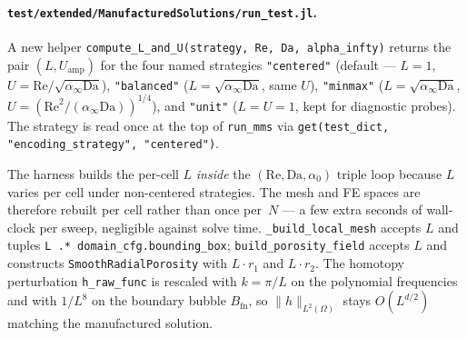 \documentclass[11pt]{article}
\newcommand{\code}[1]{\texttt{#1}}
\begin{document}
\paragraph{\texttt{test/extended/ManufacturedSolutions/run\_test.jl}.}
A new helper
\code{compute\_L\_and\_U(strategy, Re, Da, alpha\_infty)}
returns the pair $(L, U_{\text{amp}})$ for the four named strategies
\code{"centered"} (default — $L = 1$, $U = \mathrm{Re}/\sqrt{\alpha_\infty \mathrm{Da}}$),
\code{"balanced"} ($L = \sqrt{\alpha_\infty \mathrm{Da}}$,
same $U$),
\code{"minmax"} ($L = \sqrt{\alpha_\infty \mathrm{Da}}$,
$U = (\mathrm{Re}^2 / (\alpha_\infty \mathrm{Da}))^{1/4}$), and
\code{"unit"} ($L = U = 1$, kept for diagnostic probes). The strategy
is read once at the top of \code{run\_mms} via
\code{get(test\_dict, "encoding\_strategy", "centered")}.

The harness builds the per-cell $L$ \emph{inside} the
$(\mathrm{Re}, \mathrm{Da}, \alpha_0)$ triple loop because $L$ varies
per cell under non-centered strategies. The mesh and FE spaces are
therefore rebuilt per cell rather than once per~$N$ — a few extra
seconds of wall-clock per sweep, negligible against solve time.
\code{\_build\_local\_mesh} accepts $L$ and tuples
\code{L .* domain\_cfg.bounding\_box}; \code{build\_porosity\_field}
accepts $L$ and constructs \code{SmoothRadialPorosity} with
$L \cdot r_1$ and $L \cdot r_2$. The homotopy perturbation
\code{h\_raw\_func} is rescaled with $k = \pi/L$ on the polynomial
frequencies and with $1/L^8$ on the boundary bubble $B_{\text{fn}}$,
so $\|h\|_{L^2(\Omega)}$ stays $O(L^{d/2})$ matching the manufactured
solution.
\end{document}
